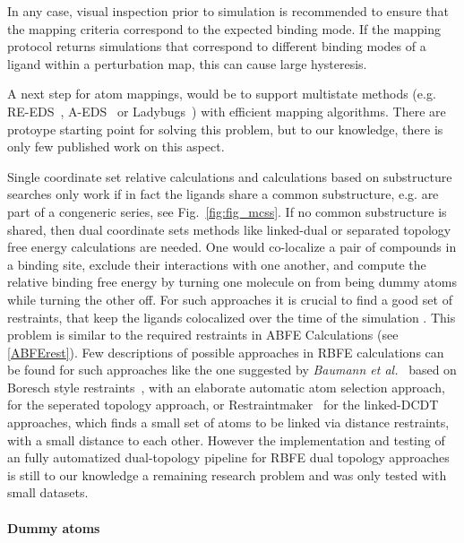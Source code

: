 \documentclass[9pt,bestpractices]{livecoms}
\begin{document}
In any case, visual inspection prior to simulation is recommended to ensure that the mapping criteria correspond to the expected binding mode. If the mapping protocol returns simulations that correspond to different binding modes of a ligand within a perturbation map, this can cause large hysteresis.

A next step for atom mappings, would be to support multistate methods (e.g. RE-EDS~\cite{sidler2016replica}, A-EDS~\cite{perthold2020toward} or Ladybugs~\cite{robo2023fast}) with efficient mapping algorithms. There are protoype starting point for solving this problem, but to our knowledge, there is only few published work on this aspect. \cite{petrov2021perturbation}

Single coordinate set relative calculations and calculations based on substructure searches only work if in fact the ligands share a common substructure, e.g. are part of a congeneric series, see Fig.~\ref{fig:fig_mcss}.
If no common substructure is shared, then dual coordinate sets methods like linked-dual or separated topology free energy calculations are needed. One would co-localize a pair of compounds in a binding site, exclude their interactions with one another, and compute the relative binding free energy by turning one molecule on from being dummy atoms while turning the other off.
For such approaches it is crucial to find a good set of restraints, that keep the ligands colocalized over the time of the simulation . This problem is similar to the required restraints in ABFE Calculations (see \ref{ABFErest}). Few descriptions of possible approaches in RBFE calculations can be found for such approaches like the one suggested by \textit{Baumann et al.}~\cite{baumann2023broadening} based on Boresch style restraints~\cite{boresch2003absolute}, with an elaborate automatic atom selection approach, for the seperated topology approach, or Restraintmaker~\cite{ries2022restraintmaker} for the linked-DCDT approaches, which finds a small set of atoms to be linked via distance restraints, with a small distance to each other. 
However the implementation and testing of an fully automatized dual-topology pipeline for RBFE dual topology approaches is still to our knowledge a remaining research problem and was only tested with small datasets. \cite{jespers2019qligfep, rieder2022lev}

\paragraph{Dummy atoms}
\end{document}

